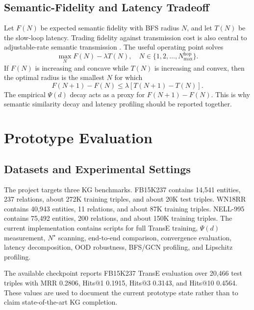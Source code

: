 \documentclass[journal]{IEEEtran}
\begin{document}
\subsection{Semantic-Fidelity and Latency Tradeoff}

Let $F(N)$ be expected semantic fidelity with BFS radius $N$, and let $T(N)$ be the slow-loop latency. Trading fidelity against transmission cost is also central to adjustable-rate semantic transmission \cite{li2023fast,gunduz2025jscc}. The useful operating point solves
\begin{equation}
\max_N F(N)-\lambda T(N), \quad N\in\{1,2,\ldots,N_{\max}^{\mathrm{hop}}\}.
\end{equation}
If $F(N)$ is increasing and concave while $T(N)$ is increasing and convex, then the optimal radius is the smallest $N$ for which
\begin{equation}
F(N+1)-F(N)\leq \lambda [T(N+1)-T(N)].
\end{equation}
The empirical $\Psi(d)$ decay acts as a proxy for $F(N+1)-F(N)$. This is why semantic similarity decay and latency profiling should be reported together.

\section{Prototype Evaluation}

\subsection{Datasets and Experimental Settings}

The project targets three KG benchmarks. FB15K237 contains 14,541 entities, 237 relations, about 272K training triples, and about 20K test triples. WN18RR contains 40,943 entities, 11 relations, and about 87K training triples. NELL-995 contains 75,492 entities, 200 relations, and about 150K training triples. The current implementation contains scripts for full TransE training, $\Psi(d)$ measurement, $N^\star$ scanning, end-to-end comparison, convergence evaluation, latency decomposition, OOD robustness, BFS/GCN profiling, and Lipschitz profiling.

The available checkpoint reports FB15K237 TransE evaluation over 20,466 test triples with MRR 0.2806, Hits@1 0.1915, Hits@3 0.3143, and Hits@10 0.4564. These values are used to document the current prototype state rather than to claim state-of-the-art KG completion.
\end{document}
